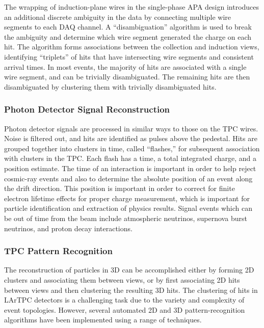 The wrapping of induction-plane wires in the single-phase APA design
introduces an additional discrete ambiguity in the data by connecting
multiple wire segments to each DAQ channel. A ``disambiguation''
algorithm is used to break the ambiguity and determine which wire
segment generated the charge on each hit.  The algorithm forms
associations between the collection and induction views, identifying
``triplets'' of hits that have intersecting wire segments and
consistent arrival times. In most events, the majority of hits are
associated with a single wire segment, and can be trivially
disambiguated.  The remaining hits are then disambiguated by
clustering them with trivially disambiguated hits.

\subsubsection{Photon Detector Signal Reconstruction}

Photon detector signals are processed in similar ways to those on the
TPC wires.  Noise is filtered out, and hits are identified as pulses
above the pedestal.  Hits are grouped together into clusters in time,
called ``flashes,'' for subsequent association with clusters in the
TPC.  Each flash has a time, a total integrated charge, and a position
estimate.  The time of an interaction is important in order to help
reject cosmic-ray events and also to determine the absolute position
of an event along the drift direction.  This position is important in
order to correct for finite electron lifetime effects for proper
charge measurement, which is important for particle identification and
extraction of physics results.  Signal events which can be out of time
from the beam include atmospheric neutrinos, supernova burst
neutrinos, and proton decay interactions.

\subsubsection{TPC Pattern Recognition}

The reconstruction of particles in 3D can be accomplished either by
forming 2D clusters and associating them between views, or by first
associating 2D hits between views and then clustering the resulting 3D
hits.  The clustering of hits in LArTPC detectors is a challenging
task due to the variety and complexity of event topologies.  However,
several automated 2D and 3D pattern-recognition algorithms have been
implemented using a range of techniques.

